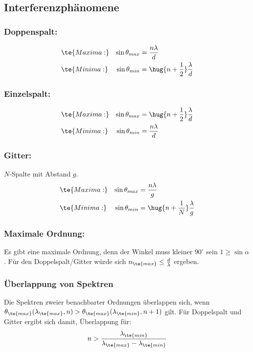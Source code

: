 \documentclass[twocolumn, unnumberedsubsub]{summery_3.1}
\begin{document}
\subsection{Interferenzphänomene}
\subsubsection{Doppenspalt:}\tight
\begin{align*}
    &\te{Maxima:} & \sin\theta_{max} &= \frac{n\lambda}{d}\\    
    &\te{Minima:} & \sin\theta_{min} &= \hug{n+\frac12}\frac{\lambda}{d}  
\end{align*}\tight

\subsubsection{Einzelspalt:}\tight
\begin{align*}
    &\te{Maxima:} & \sin\theta_{max} &=  \hug{n+\frac12}\frac{\lambda}{d}\\    
    &\te{Minima:} & \sin\theta_{min} &= \frac{n\lambda}{d}    
\end{align*}\tight

\subsubsection{Gitter:}
\(N\)-Spalte mit Abstand \(g\).
\begin{align*}
    &\te{Maxima:} & \sin\theta_{max} &=  \frac{n\lambda}{g}\\    
    &\te{Minima:} & \sin\theta_{min} &= \hug{n+\frac1N}\frac{\lambda}{g}    
\end{align*}\tight

\subsubsection{Maximale Ordnung:}
Es gibt eine maximale Ordnung, denn der Winkel muss kleiner \(90^\circ\) sein \(1\ge\sin\alpha\). Für den Doppelspalt/Gitter würde sich 
\(n_{\te{max}}\le\frac d\lambda\) ergeben.

\subsubsection{Überlappung von Spektren}
Die Spektren zweier benachbarter Ordnungen überlappen sich, wenn 
\(\theta_{\te{max}}(\lambda_{\te{max}}, n) > \theta_{\te{max}}(\lambda_{\te{min}}, n+1)\) gilt.
Für Doppelspalt und Gitter ergibt sich damit, Überlappung für:
\begin{align*}
    n > \frac{\lambda_{\te{min}}}{\lambda_{\te{max}} - \lambda_{\te{min}}}
\end{align*}
\end{document}
